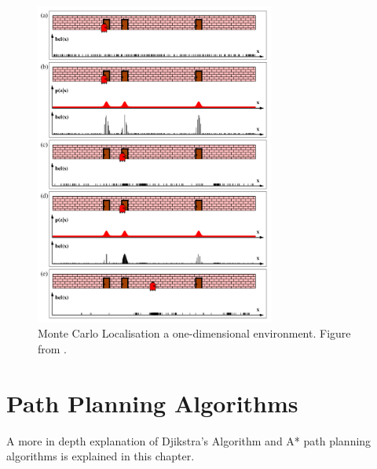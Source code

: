 \begin{figure}[htp]
  \centering
  \includegraphics[width = 0.7\textwidth]{Figures/figMCL.pdf}
  \caption{Monte Carlo Localisation a one-dimensional environment. Figure from \cite{ThrunSebastian2005Pr}.}
  \label{fig:monteCarloLocalisation}
\end{figure}

\chapter{Path Planning Algorithms}
A more in depth explanation of Djikstra's Algorithm and A* path planning algorithms is explained in this chapter.

